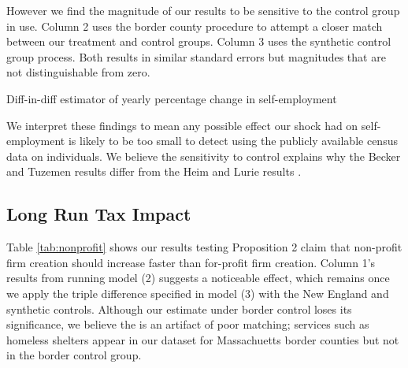 \documentclass[12pt]{article}
\begin{document}
However we find the magnitude of our results to be sensitive to the control group in use. Column 2 uses the border county procedure to attempt a closer match between our treatment and control groups. Column 3 uses the synthetic control group process. Both results in similar standard errors but magnitudes that are not distinguishable from zero. 
\begin{center}
	\begin{table}[H]
		\centering
			\caption{Diff-in-diff estimator of yearly percentage change in self-employment} 
			
		\label{tab:control}
	\end{table}		
\end{center}
\begin{comment}
\multicolumn{4}{l}{\footnotesize Diff-in-diff model of health care reform from 2000 to 2012 with Massachusetts treated after 2007. }\\
\multicolumn{4}{l}{\footnotesize Maine, Connecticut, Vermont, Rhode Island and New Hampshire used as controls in column (1). }\\
\multicolumn{4}{l}{\footnotesize Column (3) uses a synthetic control model that matches each Massachuetts county pre-trend against}\\
\multicolumn{4}{l}{\footnotesize \space US counties with similar income, age, urban and insurance rate characteristics. }\\
s. 
\end{comment}

We interpret these findings to mean any possible effect our shock had on self-employment is likely to be too small to detect using the publicly available census data on individuals. We believe the sensitivity to control explains why the Becker and Tuzemen \cite{tuzemen} results differ from the Heim and Lurie results \cite{heimLurie}. 

\subsection{Long Run Tax Impact}

Table \ref{tab:nonprofit} shows our results testing Proposition 2 claim that non-profit firm creation should increase faster than for-profit firm creation. Column 1's results from running model (2) suggests a noticeable effect, which remains once we apply the triple difference specified in model (3) with the New England and synthetic controls. Although our estimate under border control loses its significance, we believe the is an artifact of poor matching; services such as homeless shelters appear in our dataset for Massachuetts border counties but not in the border control group. 
\end{document}
